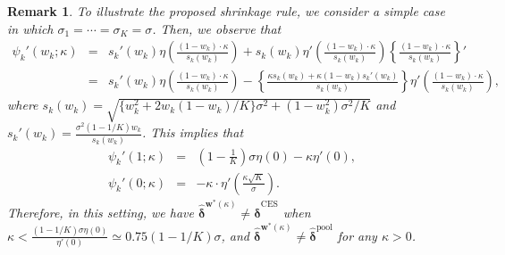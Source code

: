 \documentclass[12pt,a4paper]{article}
\newtheorem{Remark}{Remark}
\begin{document}
\begin{Remark}\label{rem:shrinkage_simple}
To illustrate the proposed shrinkage rule, we consider a simple case in which $\sigma_1 = \cdots = \sigma_K = \sigma$. Then, we observe that
\begin{eqnarray*}
\psi_k'(w_k;\kappa) &=& s_k'(w_k) \eta \left( \frac{(1-w_k) \cdot \kappa}{s_k(w_k)} \right) + s_k(w_k) \eta'\left( \frac{(1-w_k) \cdot \kappa}{s_k(w_k)} \right) \left\{ \frac{(1-w_k) \cdot \kappa}{s_k(w_k)} \right\}' \\
&=& s_k'(w_k) \eta \left( \frac{(1-w_k) \cdot \kappa}{s_k(w_k)} \right) - \left\{ \frac{\kappa s_k(w_k) + \kappa (1-w_k) s_k'(w_k)}{s_k(w_k)} \right\} \eta'\left( \frac{(1-w_k) \cdot \kappa}{s_k(w_k)} \right),
\end{eqnarray*}
where $s_k(w_k) = \sqrt{\{w_k^2 + 2w_k(1-w_k)/K \} \sigma^2 + (1-w_k^2)\sigma^2/K}$ and $s_k'(w_k) = \frac{\sigma^2 (1-1/K) w_k}{s_k(w_k)}$. This implies that
\begin{eqnarray*}
\psi_k'(1;\kappa) &=& \left( 1- \frac{1}{K} \right) \sigma \eta(0) - \kappa \eta'(0), \\
\psi_k'(0;\kappa) &=&  - \kappa \cdot \eta'\left( \frac{\kappa \sqrt{K}}{\sigma} \right).
\end{eqnarray*}
Therefore, in this setting, we have $\hat{\bm{\delta}}^{\bm{w}^{\ast}(\kappa)} \neq \hat{\bm{\delta}}^{\mathrm{CES}}$ when $\kappa < \frac{(1-1/K) \sigma \eta(0)}{\eta'(0)} \simeq 0.75 \left( 1-1/K \right) \sigma$, and $\hat{\bm{\delta}}^{\bm{w}^{\ast}(\kappa)} \neq \hat{\bm{\delta}}^{\mathrm{pool}}$ for any $\kappa > 0$.
\end{Remark}
\end{document}
